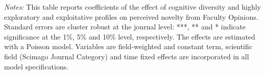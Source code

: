 \begin{table}[h!]
{\begin{threeparttable}
\begin{tablenotes}
 \footnotesize
 \justifying \item {\it Notes:}
 This table reports coefficients of the effect of cognitive diversity and highly exploratory and exploitative profiles on perceived novelty from Faculty Opinions. Standard errors are cluster robust at the journal level: ***, ** and * indicate significance at the 1\%, 5\% and 10\% level, respectively. The effects are estimated with a Poisson model. Variables are field-weighted and constant term, scientific field (Scimago Journal Category) and time fixed effects are incorporated in all model specifications.
 \end{tablenotes}
 \end{threeparttable}
 }
\end{table} 